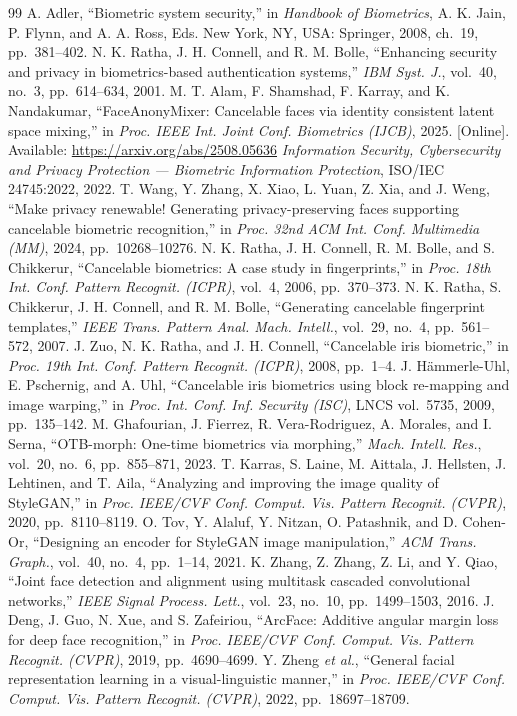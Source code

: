 \documentclass[12pt,a4paper]{article}
\begin{document}
\begin{thebibliography}{99}
 A. Adler, ``Biometric system security,'' in \emph{Handbook of Biometrics}, A. K. Jain, P. Flynn, and A. A. Ross, Eds. New York, NY, USA: Springer, 2008, ch.~19, pp.~381--402.
 N. K. Ratha, J. H. Connell, and R. M. Bolle, ``Enhancing security and privacy in biometrics-based authentication systems,'' \emph{IBM Syst. J.}, vol.~40, no.~3, pp.~614--634, 2001.
 M. T. Alam, F. Shamshad, F. Karray, and K. Nandakumar, ``FaceAnonyMixer: Cancelable faces via identity consistent latent space mixing,'' in \emph{Proc. IEEE Int. Joint Conf. Biometrics (IJCB)}, 2025. [Online]. Available: \url{https://arxiv.org/abs/2508.05636}
 \emph{Information Security, Cybersecurity and Privacy Protection — Biometric Information Protection}, ISO/IEC 24745:2022, 2022.
 T. Wang, Y. Zhang, X. Xiao, L. Yuan, Z. Xia, and J. Weng, ``Make privacy renewable! Generating privacy-preserving faces supporting cancelable biometric recognition,'' in \emph{Proc. 32nd ACM Int. Conf. Multimedia (MM)}, 2024, pp.~10268--10276.
 N. K. Ratha, J. H. Connell, R. M. Bolle, and S. Chikkerur, ``Cancelable biometrics: A case study in fingerprints,'' in \emph{Proc. 18th Int. Conf. Pattern Recognit. (ICPR)}, vol.~4, 2006, pp.~370--373.
 N. K. Ratha, S. Chikkerur, J. H. Connell, and R. M. Bolle, ``Generating cancelable fingerprint templates,'' \emph{IEEE Trans. Pattern Anal. Mach. Intell.}, vol.~29, no.~4, pp.~561--572, 2007.
 J. Zuo, N. K. Ratha, and J. H. Connell, ``Cancelable iris biometric,'' in \emph{Proc. 19th Int. Conf. Pattern Recognit. (ICPR)}, 2008, pp.~1--4.
 J. Hämmerle-Uhl, E. Pschernig, and A. Uhl, ``Cancelable iris biometrics using block re-mapping and image warping,'' in \emph{Proc. Int. Conf. Inf. Security (ISC)}, LNCS vol.~5735, 2009, pp.~135--142.
 M. Ghafourian, J. Fierrez, R. Vera-Rodriguez, A. Morales, and I. Serna, ``OTB-morph: One-time biometrics via morphing,'' \emph{Mach. Intell. Res.}, vol.~20, no.~6, pp.~855--871, 2023.
 T. Karras, S. Laine, M. Aittala, J. Hellsten, J. Lehtinen, and T. Aila, ``Analyzing and improving the image quality of StyleGAN,'' in \emph{Proc. IEEE/CVF Conf. Comput. Vis. Pattern Recognit. (CVPR)}, 2020, pp.~8110--8119.
 O. Tov, Y. Alaluf, Y. Nitzan, O. Patashnik, and D. Cohen-Or, ``Designing an encoder for StyleGAN image manipulation,'' \emph{ACM Trans. Graph.}, vol.~40, no.~4, pp.~1--14, 2021.
 K. Zhang, Z. Zhang, Z. Li, and Y. Qiao, ``Joint face detection and alignment using multitask cascaded convolutional networks,'' \emph{IEEE Signal Process. Lett.}, vol.~23, no.~10, pp.~1499--1503, 2016.
 J. Deng, J. Guo, N. Xue, and S. Zafeiriou, ``ArcFace: Additive angular margin loss for deep face recognition,'' in \emph{Proc. IEEE/CVF Conf. Comput. Vis. Pattern Recognit. (CVPR)}, 2019, pp.~4690--4699.
 Y. Zheng \emph{et al.}, ``General facial representation learning in a visual-linguistic manner,'' in \emph{Proc. IEEE/CVF Conf. Comput. Vis. Pattern Recognit. (CVPR)}, 2022, pp.~18697--18709.
\end{thebibliography}
\end{document}

